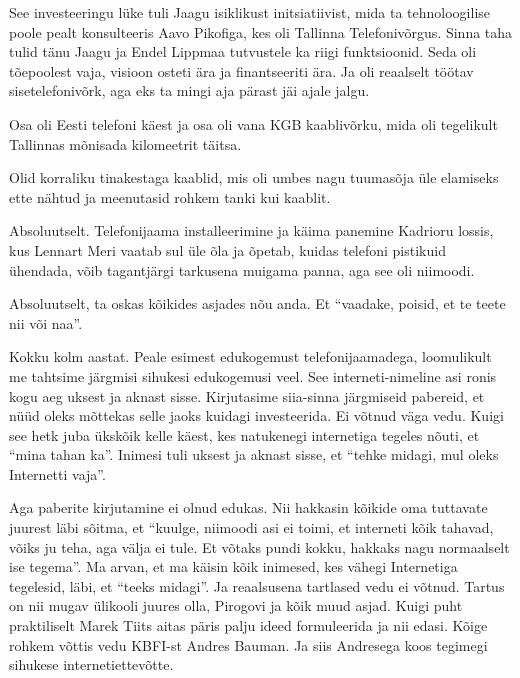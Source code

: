 
See investeeringu lüke tuli Jaagu isiklikust initsiatiivist, mida ta  
tehnoloogilise poole pealt konsulteeris Aavo Pikofiga, 
kes oli Tallinna Telefonivõrgus. Sinna taha tulid tänu Jaagu ja Endel 
Lippmaa tutvustele ka riigi funktsioonid. Seda oli 
tõepoolest vaja, visioon osteti ära ja finantseeriti ära. Ja oli reaalselt 
töötav sisetelefonivõrk, aga eks ta mingi aja pärast jäi ajale jalgu.


Osa oli Eesti telefoni käest ja osa oli vana KGB kaablivõrku, mida oli 
tegelikult Tallinnas mõnisada kilomeetrit täitsa.


Olid korraliku tinakestaga kaablid, mis oli umbes nagu tuumasõja üle elamiseks 
ette nähtud ja meenutasid rohkem tanki kui kaablit.


Absoluutselt. Telefonijaama installeerimine ja käima panemine Kadrioru lossis, 
kus Lennart Meri vaatab sul üle õla ja õpetab, kuidas 
telefoni pistikuid ühendada, võib tagantjärgi tarkusena muigama panna, aga see 
oli niimoodi. 


Absoluutselt, ta oskas kõikides asjades nõu anda. Et \enquote{vaadake, poisid, 
et te teete nii või naa}.


Kokku kolm aastat. Peale esimest edukogemust telefonijaamadega, loomulikult me 
tahtsime järgmisi sihukesi edukogemusi veel. See interneti-nimeline asi ronis 
kogu aeg uksest ja aknast sisse. Kirjutasime siia-sinna järgmiseid pabereid, et 
nüüd oleks mõttekas selle jaoks kuidagi investeerida. Ei võtnud väga vedu. 
Kuigi see hetk juba ükskõik kelle käest, kes natukenegi internetiga tegeles 
nõuti, et \enquote{mina tahan ka}. Inimesi tuli uksest ja aknast sisse, et 
\enquote{tehke midagi, mul oleks Internetti vaja}. 

Aga paberite kirjutamine ei olnud edukas. Nii hakkasin kõikide oma tuttavate 
juurest läbi sõitma, et \enquote{kuulge, niimoodi asi ei toimi, et interneti 
kõik tahavad, võiks ju teha, aga välja ei tule. Et  võtaks pundi kokku, hakkaks 
nagu normaalselt ise tegema}. Ma arvan, et ma käisin kõik inimesed, kes vähegi 
Internetiga tegelesid, läbi, et \enquote{teeks midagi}. Ja reaalsusena 
tartlased vedu ei võtnud. Tartus on nii mugav ülikooli juures olla,  Pirogovi 
ja kõik muud asjad. Kuigi puht praktiliselt Marek Tiits aitas päris palju ideed formuleerida ja nii edasi. Kõige rohkem võttis 
vedu KBFI-st Andres Bauman. Ja siis 
Andresega koos tegimegi sihukese internetiettevõtte. 

